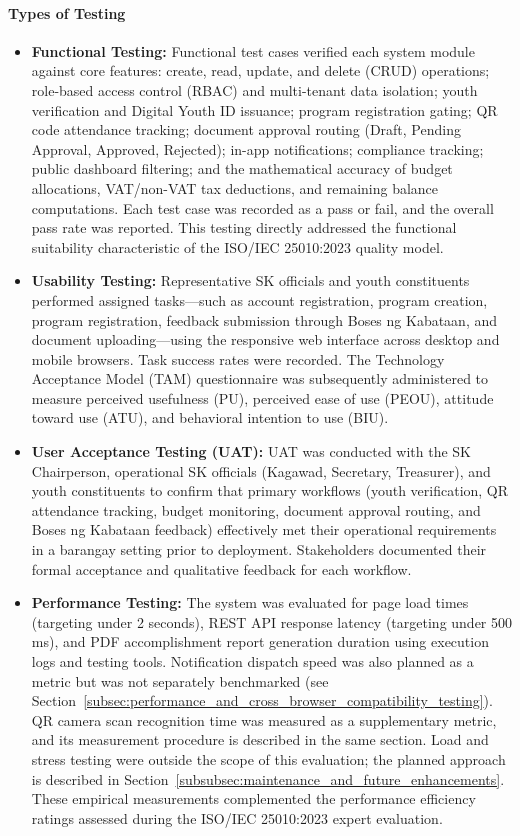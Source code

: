 \paragraph{Types of Testing}
\label{par:types_of_testing}
\begin{itemize}
    \item \textbf{Functional Testing:} Functional test cases verified each system module against core features: create, read, update, and delete (CRUD) operations; role-based access control (RBAC) and multi-tenant data isolation; youth verification and Digital Youth ID issuance; program registration gating; QR code attendance tracking; document approval routing (Draft, Pending Approval, Approved, Rejected); in-app notifications; compliance tracking; public dashboard filtering; and the mathematical accuracy of budget allocations, VAT/non-VAT tax deductions, and remaining balance computations. Each test case was recorded as a pass or fail, and the overall pass rate was reported. This testing directly addressed the functional suitability characteristic of the ISO/IEC 25010:2023 quality model.
    \item \textbf{Usability Testing:} Representative SK officials and youth constituents performed assigned tasks---such as account registration, program creation, program registration, feedback submission through Boses ng Kabataan, and document uploading---using the responsive web interface across desktop and mobile browsers. Task success rates were recorded. The Technology Acceptance Model (TAM) questionnaire was subsequently administered to measure perceived usefulness (PU), perceived ease of use (PEOU), attitude toward use (ATU), and behavioral intention to use (BIU).
    \item \textbf{User Acceptance Testing (UAT):} UAT was conducted with the SK Chairperson, operational SK officials (Kagawad, Secretary, Treasurer), and youth constituents to confirm that primary workflows (youth verification, QR attendance tracking, budget monitoring, document approval routing, and Boses ng Kabataan feedback) effectively met their operational requirements in a barangay setting prior to deployment. Stakeholders documented their formal acceptance and qualitative feedback for each workflow.
    \item \textbf{Performance Testing:} The system was evaluated for page load times (targeting under 2 seconds), REST API response latency (targeting under 500 ms), and PDF accomplishment report generation duration using execution logs and testing tools. Notification dispatch speed was also planned as a metric but was not separately benchmarked (see Section~\ref{subsec:performance_and_cross_browser_compatibility_testing}). QR camera scan recognition time was measured as a supplementary metric, and its measurement procedure is described in the same section. Load and stress testing were outside the scope of this evaluation; the planned approach is described in Section~\ref{subsubsec:maintenance_and_future_enhancements}. These empirical measurements complemented the performance efficiency ratings assessed during the ISO/IEC 25010:2023 expert evaluation.

\end{itemize}
